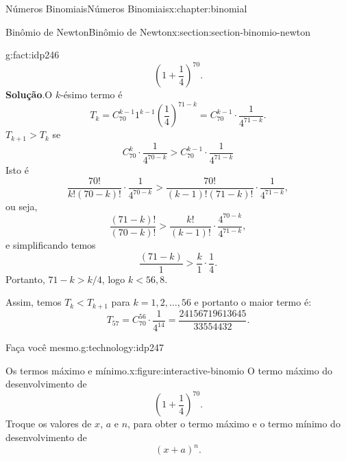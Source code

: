 \documentclass[oneside,10pt,]{book}
\newcommand{\blocktitlefont}{\relax}
\numberwithin{equation}{section}
\newlength{\qrsize}
\newlength{\previewwidth}
\newcommand{\lt}{<}
\begin{document}
\begin{chapterptx}{Números Binomiais}{}{Números Binomiais}{}{}{x:chapter:binomial}
\begin{sectionptx}{Binômio de Newton}{}{Binômio de Newton}{}{}{x:section:section-binomio-newton}
\begin{fact}{}{}{g:fact:idp246}
\begin{equation*}
\left(1 + \frac{1}{4}\right)^{70}.
\end{equation*}
%
\textbf{\blocktitlefont Solução}.\quad{}O \(k\)-ésimo termo é%
\begin{equation*}
T_{k} = C_{70}^{k-1}1^{k-1}\left(\frac{1}{4}\right)^{71-k} = C_{70}^{k-1}\cdot\frac{1}{4^{71-k}}\text{.}
\end{equation*}
\(T_{k+1}> T_{k}\) se%
\begin{equation*}
C_{70}^{k}\cdot\frac{1}{4^{70-k}} > C_{70}^{k-1}\cdot\frac{1}{4^{71-k}} 
\end{equation*}
Isto é%
\begin{equation*}
\frac{70!}{k!(70-k)!}\cdot\frac{1}{4^{70-k}} > \frac{70!}{(k-1)!(71-k)!}\cdot\frac{1}{4^{71-k}}, 
\end{equation*}
ou seja,%
\begin{equation*}
\frac{(71-k)!}{(70-k)!} > \frac{k!}{(k-1)!}\cdot\frac{4^{70-k}}{4^{71-k}}, 
\end{equation*}
e simplificando temos%
\begin{equation*}
\frac{(71-k)}{1} > \frac{k}{1}\cdot\frac{1}{4}. 
\end{equation*}
Portanto, \(71-k > k/4 \), logo \(k\lt 56, 8\).%
\par
Assim, temos  \(T_{k} \lt  T_{k+1}\) para \(k = 1, 2, \ldots, 56\) e portanto o maior termo é:%
\begin{equation*}
T_{57} = C_{70}^{56}\cdot\frac{1}{4^{14}} = \frac{24156719613645}{33554432}.
\end{equation*}
%
\end{fact}
\begin{technology}{Faça você mesmo.}{g:technology:idp247}%
\begin{figureptx}{Os termos máximo e mínimo.}{x:figure:interactive-binomio}{}%
\centering
O termo máximo do desenvolvimento de%
\begin{equation*}
\left(1 + \frac{1}{4}\right)^{70}.
\end{equation*}
Troque os valores de \(x\), \(a\) e \(n\), para obter o termo máximo e o termo mínimo do desenvolvimento de%
\begin{equation*}
(x+a)^n.
\end{equation*}
%
\setlength{\qrsize}{9em}
\setlength{\previewwidth}{\linewidth}
\addtolength{\previewwidth}{-\qrsize}
\begin{tcbraster}[raster columns=2, raster column skip=1pt, raster halign=center, raster force size=false, raster left skip=0pt, raster right skip=0pt]%

\end{tcbraster}
\end{figureptx}
\end{technology}
\end{sectionptx}
\end{chapterptx}
\end{document}
